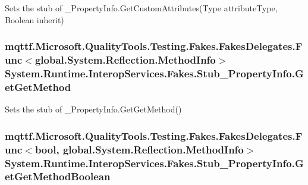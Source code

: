 Sets the stub of \-\_\-\-Property\-Info.\-Get\-Custom\-Attributes(\-Type attribute\-Type, Boolean inherit)

\hypertarget{class_system_1_1_runtime_1_1_interop_services_1_1_fakes_1_1_stub___property_info_ac24cd7b3e41925bf46ea12a09abc2981}{
\subsubsection[{Get\-Get\-Method}]{\setlength{\rightskip}{0pt plus 5cm}mqttf.\-Microsoft.\-Quality\-Tools.\-Testing.\-Fakes.\-Fakes\-Delegates.\-Func$<$global.\-System.\-Reflection.\-Method\-Info$>$ System.\-Runtime.\-Interop\-Services.\-Fakes.\-Stub\-\_\-\-Property\-Info.\-Get\-Get\-Method}}\label{class_system_1_1_runtime_1_1_interop_services_1_1_fakes_1_1_stub___property_info_ac24cd7b3e41925bf46ea12a09abc2981}


Sets the stub of \-\_\-\-Property\-Info.\-Get\-Get\-Method()

\hypertarget{class_system_1_1_runtime_1_1_interop_services_1_1_fakes_1_1_stub___property_info_a38968a786aecd9ce193c0f2c9ee307fe}{
\subsubsection[{Get\-Get\-Method\-Boolean}]{\setlength{\rightskip}{0pt plus 5cm}mqttf.\-Microsoft.\-Quality\-Tools.\-Testing.\-Fakes.\-Fakes\-Delegates.\-Func$<$bool, global.\-System.\-Reflection.\-Method\-Info$>$ System.\-Runtime.\-Interop\-Services.\-Fakes.\-Stub\-\_\-\-Property\-Info.\-Get\-Get\-Method\-Boolean}}\label{class_system_1_1_runtime_1_1_interop_services_1_1_fakes_1_1_stub___property_info_a38968a786aecd9ce193c0f2c9ee307fe}


